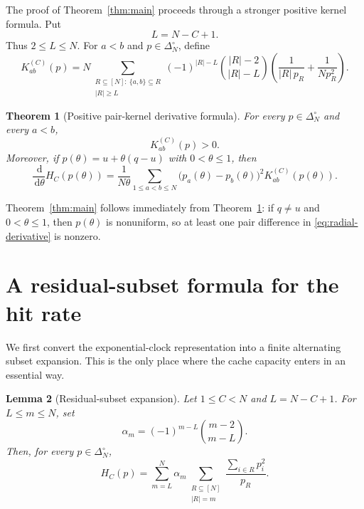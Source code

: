 \documentclass[11pt]{article}
\newtheorem{theorem}{Theorem}[section]
\newtheorem{lemma}[theorem]{Lemma}
\theoremstyle{remark}
\newcommand{\dd}{\,\mathrm{d}}
\newcommand{\card}[1]{\lvert #1\rvert}
\begin{document}
The proof of Theorem~\ref{thm:main} proceeds through a stronger positive
kernel formula.  Put
\[
        L=N-C+1.
\]
Thus $2\le L\le N$.  For $a<b$ and $p\in\Delta_N^\circ$, define
\begin{equation}\label{eq:kernel-def}
        K_{ab}^{(C)}(p)
        =
        N
        \sum_{\substack{R\subseteq[N]:\ \{a,b\}\subseteq R\\ \card R\ge L}}
        (-1)^{\card R-L}
        \binom{\card R-2}{\card R-L}
        \left(
            \frac{1}{\card R\,p_R}
            +\frac{1}{N p_R^2}
        \right).
\end{equation}

\begin{theorem}[Positive pair-kernel derivative formula]\label{thm:kernel}
For every $p\in\Delta_N^\circ$ and every $a<b$,
\[
        K_{ab}^{(C)}(p)>0.
\]
Moreover, if $p(\theta)=u+\theta(q-u)$ with $0<\theta\le1$, then
\begin{equation}\label{eq:radial-derivative}
        \frac{\dd}{\dd\theta}H_C(p(\theta))
        =
        \frac{1}{N\theta}
        \sum_{1\le a<b\le N}
        \bigl(p_a(\theta)-p_b(\theta)\bigr)^2
        K_{ab}^{(C)}(p(\theta)).
\end{equation}
\end{theorem}

Theorem~\ref{thm:main} follows immediately from Theorem~\ref{thm:kernel}:
if $q\ne u$ and $0<\theta\le1$, then $p(\theta)$ is nonuniform, so at
least one pair difference in \eqref{eq:radial-derivative} is nonzero.

\section{A residual-subset formula for the hit rate}

We first convert the exponential-clock representation into a finite
alternating subset expansion.  This is the only place where the cache
capacity enters in an essential way.

\begin{lemma}[Residual-subset expansion]\label{lem:residual}
Let $1\le C<N$ and $L=N-C+1$.  For $L\le m\le N$, set
\[
        \alpha_m=(-1)^{m-L}\binom{m-2}{m-L}.
\]
Then, for every $p\in\Delta_N^\circ$,
\begin{equation}\label{eq:residual-formula}
        H_C(p)
        =
        \sum_{m=L}^N \alpha_m
        \sum_{\substack{R\subseteq[N]\\ \card R=m}}
        \frac{\sum_{i\in R}p_i^2}{p_R}.
\end{equation}
\end{lemma}
\end{document}
